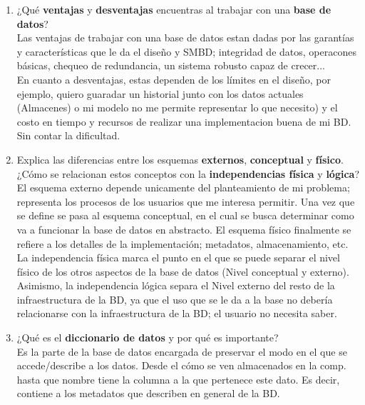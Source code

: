 \documentclass[10pt]{article}
\begin{document}
\begin{enumerate}[label=\alph*.]
    	\item {
    		¿Qué \textbf{ventajas}  y \textbf{desventajas} encuentras al 
    		trabajar con una \textbf{base de datos}?\\
    	}
    	{
    		 Las ventajas de trabajar con una base de datos estan dadas por las garantías
    		y características que le da el diseño y SMBD; integridad de datos, operacones 
    		básicas, chequeo de redundancia, un sistema robusto capaz de crecer...\\
    		En cuanto a desventajas, estas dependen de los límites en el diseño, por 
    		ejemplo,  quiero guaradar un historial junto con los datos actuales (Almacenes) 
    		o mi modelo no me permite representar lo que necesito) y el costo en tiempo y
    		recursos de realizar una implementacion buena de mi BD. Sin contar la dificultad.
    	}\\
    
    	\item {
    		Explica las diferencias entre los esquemas \textbf{externos}, 
    		\textbf{conceptual} y \textbf{físico}. ¿Cómo se relacionan estos 
    		conceptos con la \textbf{independencias física} y \textbf{lógica}? \\
    	}
    	{
    		 El esquema externo depende unicamente del planteamiento de mi problema;
    		representa los procesos de los usuarios que me interesa permitir.
    		Una vez que se define se pasa al esquema conceptual, en el cual se busca 
    		determinar como va a funcionar la base de datos en abstracto.
    		El esquema físico finalmente se refiere a los detalles de la implementación; 
    		metadatos, almacenamiento, etc.
    		La independencia física marca el punto en el que se puede separar el nivel 
    		físico de los otros aspectos de la base de datos (Nivel conceptual y externo).
    		Asimismo, la independencia lógica separa el Nivel externo del resto de la
    		infraestructura de la BD, ya que el uso que se le da a la base no debería
    		relacionarse con la infraestructura de la BD; el usuario no  necesita saber.
    	}\\
    
    	\item {
    		¿Qué es el \textbf{diccionario de datos} y por qué es importante?\\
    	}
    	{
    	    Es la parte de la base de datos encargada de preservar el modo en el que se
    		accede/describe a los datos. Desde el cómo se ven almacenados en la comp.
    		hasta que nombre tiene la columna a la que pertenece este dato. Es decir,
    		contiene a los metadatos que describen en general de la BD.
    	}\\
    

\end{enumerate}
\end{document}
